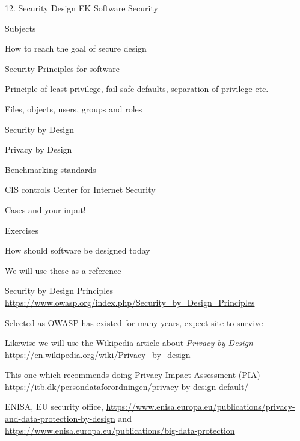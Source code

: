 \documentclass[Screen16to9,17pt]{foils}
\begin{document}
\mytitlepage
{12. Security Design}
{EK  Software Security}


\begin{list1}
\item Subjects
\begin{list2}
\item How to reach the goal of secure design
\item Security Principles for software
\item Principle of least privilege, fail-safe defaults, separation of privilege etc.
\item Files, objects, users, groups and roles
\item Security by Design
\item Privacy by Design
\item Benchmarking standards
\item CIS controls Center for Internet Security
\item Cases and your input!
\end{list2}
\item Exercises
\begin{list2}
\item How should software be designed today
\end{list2}
\end{list1}


\begin{list1}
\item We will use these as a reference
\item Security by Design Principles\\
\url{https://www.owasp.org/index.php/Security_by_Design_Principles}
\item Selected as OWASP has existed for many years, expect site to survive

\item Likewise we will use the Wikipedia article about \emph{Privacy by Design}\\
\url{https://en.wikipedia.org/wiki/Privacy_by_design}
\end{list1}



\begin{list2}
\item This one which recommends doing Privacy Impact Assessment (PIA)\\
{\footnotesize\url{https://itb.dk/persondataforordningen/privacy-by-design-default/}}
\item ENISA, EU security office, {\footnotesize\url{https://www.enisa.europa.eu/publications/privacy-and-data-protection-by-design}} and {\footnotesize\url{https://www.enisa.europa.eu/publications/big-data-protection}}
\end{list2}
\end{document}
